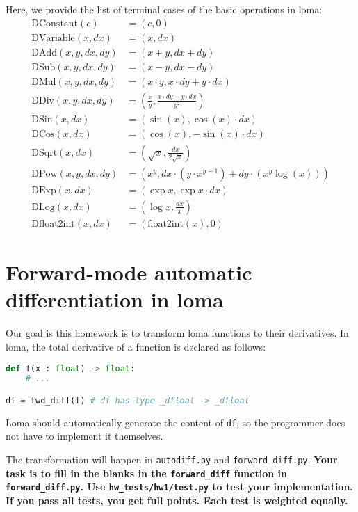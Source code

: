 Here, we provide the list of terminal cases of the basic operations in loma:
\begin{equation}
\begin{aligned}
\text{DConstant}(c) &= (c, 0) \\
\text{DVariable}(x, dx) &= (x, dx) \\
\text{DAdd}(x, y, dx, dy) &= (x + y, dx + dy) \\
\text{DSub}(x, y, dx, dy) &= (x - y, dx - dy) \\
\text{DMul}(x, y, dx, dy) &= (x \cdot y, x \cdot dy + y \cdot dx) \\
\text{DDiv}(x, y, dx, dy) &= \left(\frac{x}{y}, \frac{x \cdot dy - y \cdot dx}{y^2}\right) \\
\text{DSin}(x, dx) &= \left(\sin(x), \cos(x) \cdot dx\right) \\
\text{DCos}(x, dx) &= \left(\cos(x), -\sin(x) \cdot dx\right) \\
\text{DSqrt}(x, dx) &= \left(\sqrt{x}, \frac{dx}{2\sqrt{x}}\right) \\
\text{DPow}(x, y, dx, dy) &= \left(x^y, dx \cdot \left(y \cdot x^{y-1}\right) + dy \cdot \left(x^y \log(x)\right)\right) \\
\text{DExp}(x, dx) &= \left(\exp{x}, \exp{x} \cdot dx\right) \\
\text{DLog}(x, dx) &= \left(\log{x}, \frac{dx}{x}\right) \\
\text{Dfloat2int}(x, dx) &= \left(\text{float2int}(x), 0\right)
\end{aligned}
\end{equation}

\section{Forward-mode automatic differentiation in loma}

Our goal is this homework is to transform loma functions to their derivatives. In loma, the total derivative of a function is declared as follows:
\begin{lstlisting}[language=Python]
def f(x : float) -> float:
    # ...

df = fwd_diff(f) # df has type _dfloat -> _dfloat
\end{lstlisting}

Loma should automatically generate the content of \lstinline{df}, so the programmer does not have to implement it themselves.

The transformation will happen in \lstinline{autodiff.py} and \lstinline{forward_diff.py}. \textbf{Your task is to fill in the blanks in the \lstinline{forward_diff} function in \lstinline{forward_diff.py}. Use \lstinline{hw_tests/hw1/test.py} to test your implementation. If you pass all tests, you get full points. Each test is weighted equally.}

